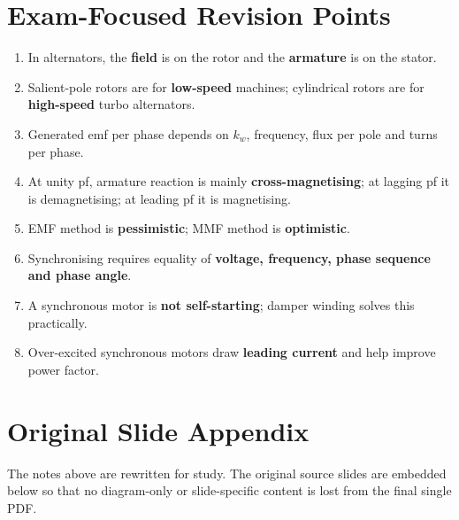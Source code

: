 \documentclass[12pt,a4paper]{article}
\newcommand{\kw}{k_w}
\begin{document}
\section{Exam-Focused Revision Points}

\begin{importantbox}
\begin{enumerate}[leftmargin=*, label=\textcolor{anthOrange}{\HeadingFont\bfseries\arabic*.}]
  \item In alternators, the \textbf{field} is on the rotor and the \textbf{armature} is on the stator.
  \item Salient-pole rotors are for \textbf{low-speed} machines; cylindrical rotors are for \textbf{high-speed} turbo alternators.
  \item Generated emf per phase depends on \(\kw\), frequency, flux per pole and turns per phase.
  \item At unity pf, armature reaction is mainly \textbf{cross-magnetising}; at lagging pf it is demagnetising; at leading pf it is magnetising.
  \item EMF method is \textbf{pessimistic}; MMF method is \textbf{optimistic}.
  \item Synchronising requires equality of \textbf{voltage, frequency, phase sequence and phase angle}.
  \item A synchronous motor is \textbf{not self-starting}; damper winding solves this practically.
  \item Over-excited synchronous motors draw \textbf{leading current} and help improve power factor.
\end{enumerate}
\end{importantbox}

\section{Original Slide Appendix}

\begin{studybox}
The notes above are rewritten for study. The original source slides are embedded below so that
no diagram-only or slide-specific content is lost from the final single PDF.
\end{studybox}
\end{document}
